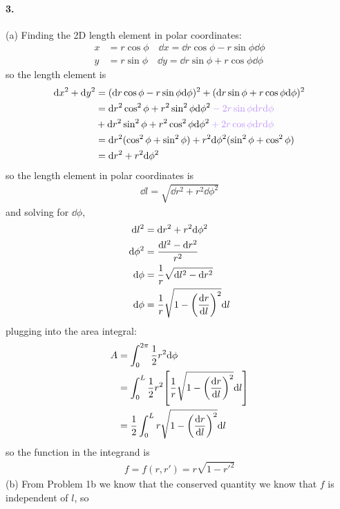 \documentclass[../hw.tex]{subfiles}
\begin{document}
\newpage
\paragraph*{3.} (a) Finding the 2D length element in polar coordinates:
\begin{align*}
    x &= r\cos\phi \quad \dd x = \dd r \cos\phi - r\sin\phi \dd\phi \\
    y &= r\sin\phi \quad \dd y = \dd r \sin\phi + r\cos\phi \dd\phi
\end{align*}
so the length element is
\begin{align*}
    \dd x^2 + \dd y^2 &= (\dd r \cos\phi - r\sin\phi \dd\phi)^2
        + (\dd r \sin\phi + r\cos\phi \dd\phi)^2 \\
    &= \dd r^2 \cos^2\phi + r^2\sin^2\phi \dd\phi^2
        \color{draculapurple} - 2r\sin\phi \dd r \dd\phi \\
    &+ \dd r^2 \sin^2\phi + r^2\cos^2\phi \dd\phi^2 
        \color{draculapurple} + 2r\cos\phi \dd r \dd\phi \\
    &= \dd r^2 (\cos^2\phi+ \sin^2\phi) + r^2 \dd\phi^2 (\sin^2\phi + \cos^2\phi) \\
    &= \dd r^2 + r^2 \dd\phi^2
\end{align*}
so the length element in polar coordinates is
\begin{align*}
    \dd l = \sqrt{\dd r^2 + r^2 \dd\phi^2}
\end{align*}
and solving for $\dd\phi$,
\begin{align*}
    \dd l^2 &= \dd r^2 + r^2 \dd\phi^2 \\
    \dd\phi^2 &= \frac{\dd l^2 - \dd r^2}{r^2} \\
    \dd\phi &= \frac{1}{r} \sqrt{\dd l^2 - \dd r^2} \\
    \dd\phi &= \frac{1}{r} \sqrt{1 - \qt(\dv{r}{l})^2} \dd l
\end{align*}
plugging into the area integral:
\begin{align*}
    A &= \int_0^{2\pi} \frac{1}{2} r^2 \dd \phi \\
    &= \int_0^L \frac{1}{2} r^2 \qt[\frac{1}{r} \sqrt{1 - \qt(\dv{r}{l})^2} \dd l] \\
    &= \frac{1}{2} \int_0^L r \sqrt{1 - \qt(\dv{r}{l})^2} \dd l
\end{align*}
so the function in the integrand is
\begin{align*}
    f = f(r, r') = r \sqrt{1 - r'^2}
\end{align*}
(b) From Problem 1b we know that the conserved quantity we know that $f$ is independent of $l$, so
\end{document}
